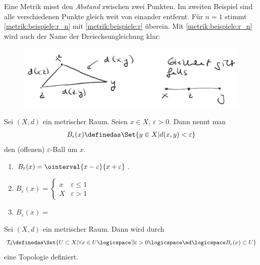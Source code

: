 Eine Metrik misst den \emph{Abstand} zwischen zwei Punkten. 
Im zweiten Beispiel sind alle verschiedenen Punkte gleich weit von einander entfernt. 
Für \( n=1 \) stimmt \ref{metrik:beispiele:r_n} mit \ref{metrik:beispiele:r} überein. 
Mit \ref{metrik:beispiele:r_n} wird auch der Name der Dreiecksungleichung klar:
\begin{figure}[H]
    \centering
    \includegraphics[width=0.8\linewidth]{figures/dreiecksungleichung_visualisierung}
    \label{fig:dreiecksungleichung_visualisierung}
\end{figure}
\begin{definition}
    Sei \( (X,d) \) ein metrischer Raum. Seien \( x\in X \), \( \varepsilon>0 \). Dann nennt man
    \begin{align*}
        B_\epsilon(x)\definedas\Set{y\in X| d(x,y)<\varepsilon}
    \end{align*}
    den (offenen) \( \varepsilon \)-Ball um \( x \).
\end{definition}
\begin{beispiele*}
    \begin{enumerate}
        \item \( B_\varepsilon(x)=\ointerval{x-\varepsilon}{x+\varepsilon} \).
        \item \( B_\varepsilon(x)=\begin{cases}
            x & \varepsilon\leq 1 \\
            X & \varepsilon>1
        \end{cases}
         \)
         
        \item \( B_\varepsilon(x)= \) 
        
    \end{enumerate}
\end{beispiele*}
\begin{satz}\label{metrische_topologie}
    Sei \( (X,d) \) ein metrischer Raum. Dann wird durch
    \begin{align*}
        \mathcal{T}_d\definedas \Set{U\subset X|\forall x\in U\logicspace\exists\varepsilon>0\logicspace\sd\logicspace B_\varepsilon(x)\subset U}
    \end{align*}
    eine Topologie definiert.
\end{satz}
